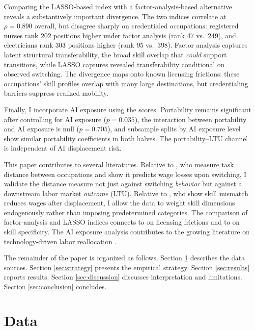 \documentclass[12pt]{article}
\begin{document}
Comparing the LASSO-based index with a factor-analysis-based alternative reveals a substantively important divergence. The two indices correlate at $\rho = 0.890$ overall, but disagree sharply on credentialed occupations: registered nurses rank 202 positions higher under factor analysis (rank 47 vs.\ 249), and electricians rank 303 positions higher (rank 95 vs.\ 398). Factor analysis captures latent structural transferability, the broad skill overlap that \emph{could} support transitions, while LASSO captures revealed transferability conditional on observed switching. The divergence maps onto known licensing frictions: these occupations' skill profiles overlap with many large destinations, but credentialing barriers suppress realized mobility.

Finally, I incorporate AI exposure using the \citet{eloundou2023} scores. Portability remains significant after controlling for AI exposure ($p = 0.035$), the interaction between portability and AI exposure is null ($p = 0.705$), and subsample splits by AI exposure level show similar portability coefficients in both halves. The portability--LTU channel is independent of AI displacement risk.

This paper contributes to several literatures. Relative to \citet{gathmann2010}, who measure task distance between occupations and show it predicts wage losses upon switching, I validate the distance measure not just against switching \emph{behavior} but against a downstream labor market \emph{outcome} (LTU). Relative to \citet{poletaev2008}, who show skill mismatch reduces wages after displacement, I allow the data to weight skill dimensions endogenously rather than imposing predetermined categories. The comparison of factor-analysis and LASSO indices connects to \citet{kleiner2013} on licensing frictions and to \citet{lazear2009} on skill specificity. The AI exposure analysis contributes to the growing literature on technology-driven labor reallocation \citep{cortes2018,autor2013}.

The remainder of the paper is organized as follows. Section \ref{sec:data} describes the data sources. Section \ref{sec:strategy} presents the empirical strategy. Section \ref{sec:results} reports results. Section \ref{sec:discussion} discusses interpretation and limitations. Section \ref{sec:conclusion} concludes.

\section{Data}
\label{sec:data}
\end{document}
